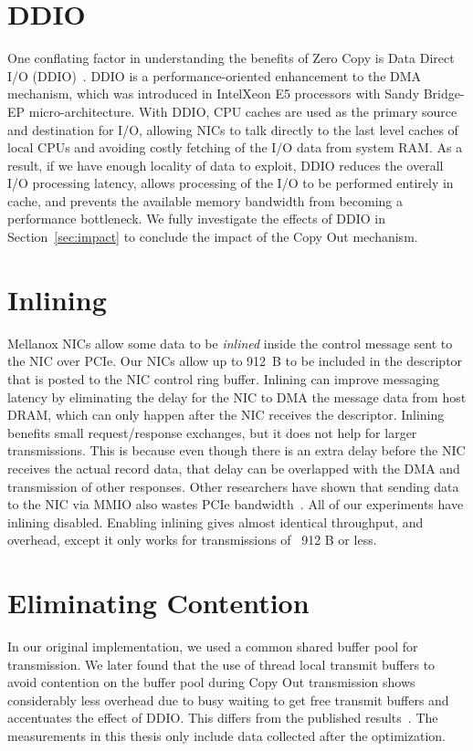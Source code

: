 \section{DDIO}
One conflating factor in understanding the benefits of Zero Copy is Data Direct I/O (DDIO)~\cite{ddio}.
 DDIO is a performance-oriented enhancement to the DMA mechanism, which was introduced in Intel\textregistered Xeon E5 processors with Sandy Bridge-EP micro-architecture.
 With DDIO, CPU caches are used as the primary source and destination for I/O, 
allowing NICs to talk directly to the last level caches of local CPUs
and avoiding costly fetching of the I/O data from system RAM. As a result, if we have enough locality of data to exploit,
DDIO reduces the overall I/O processing latency, allows processing of the I/O 
to be performed entirely in cache, and prevents the available memory bandwidth from becoming a performance bottleneck.
We fully investigate the effects of DDIO in Section~\ref{sec:impact} to conclude the impact of 
the Copy Out mechanism.


\section{Inlining}
Mellanox NICs allow some data to be {\em inlined} inside the control message
sent to the NIC over PCIe. Our NICs allow up to 912~B to be included in the
descriptor that is posted to the NIC control ring buffer.  Inlining can improve
messaging latency by eliminating the delay for the NIC to DMA the message data
from host DRAM, which can only happen after the NIC receives the descriptor.
Inlining benefits small request/response exchanges, but it does not help for
larger transmissions. This is because even though there is an extra delay
before the NIC receives the actual record data, that delay can be overlapped
with the DMA and transmission of other responses. Other researchers have shown
that sending data to the NIC via MMIO also wastes PCIe bandwidth~\cite{rdma}.
All of our experiments have inlining disabled. Enabling inlining gives almost 
identical throughput, and overhead, except it only works for transmissions of ~912 B or less.

\section{Eliminating Contention}
\label{sec:code-optimisation}
In our original implementation, we used a common shared buffer pool for transmission.
We later found that the use of thread local transmit buffers to avoid contention on the buffer pool during 
Copy Out transmission shows considerably less overhead due to busy waiting to get free transmit buffers 
and accentuates the effect of DDIO. This differs from the published results~\cite{imdmpaper}. 
The measurements in this thesis only include data collected after the optimization.

